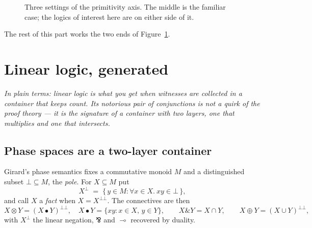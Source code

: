 \begin{figure}[h]
\centering
{}
\caption{Three settings of the primitivity axis. The middle is the familiar case;
the logics of interest here are on either side of it.}
\label{fig:primitivity}
\end{figure}

The rest of this part works the two ends of Figure~\ref{fig:primitivity}.

\section{Linear logic, generated}
\label{sec:linear}

\noindent\emph{In plain terms: linear logic is what you get when witnesses are
collected in a container that keeps count. Its notorious pair of conjunctions is
not a quirk of the proof theory --- it is the signature of a container with two
layers, one that multiplies and one that intersects.}

\subsection{Phase spaces are a two-layer container}

Girard's phase semantics \cite{Girard87} fixes a commutative monoid $M$ and a
distinguished subset $\bot \subseteq M$, the \emph{pole}. For $X \subseteq M$ put
\[
  X^{\bot} \;=\; \{\, y \in M : \forall x \in X.\ xy \in \bot \,\},
\]
and call $X$ a \emph{fact} when $X = X^{\bot\bot}$. The connectives are then
\[
  X \otimes Y = (X \bullet Y)^{\bot\bot}, \quad
  X \bullet Y = \{xy : x \in X,\, y \in Y\}, \qquad
  X \mathbin{\&} Y = X \cap Y, \qquad
  X \oplus Y = (X \cup Y)^{\bot\bot},
\]
with $X^{\bot}$ the linear negation, $\bindnasrepma$ and $\multimap$ recovered by duality.

